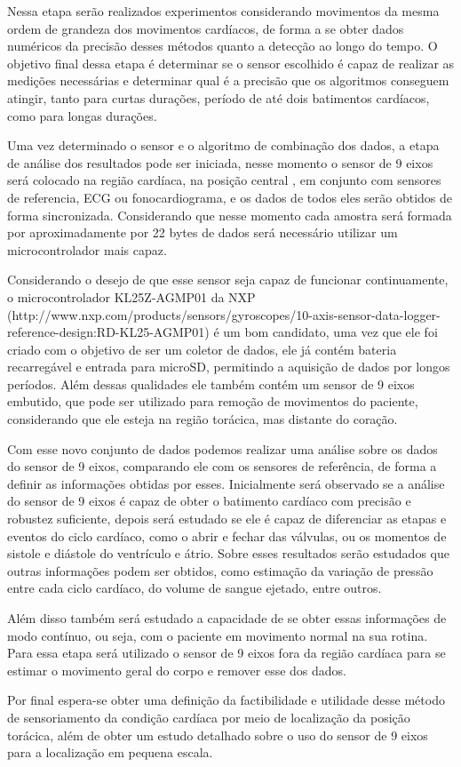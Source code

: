     Nessa etapa serão realizados experimentos considerando movimentos da mesma ordem de grandeza dos movimentos cardíacos, de forma a se obter dados numéricos da precisão desses métodos quanto a detecção ao longo do tempo. O objetivo final dessa etapa é determinar se o sensor escolhido é capaz de realizar as medições necessárias e determinar qual é a precisão que os algoritmos conseguem atingir, tanto para curtas durações, período de até dois batimentos cardíacos, como para longas durações.  

    Uma vez determinado o sensor e o algoritmo de combinação dos dados, a etapa de análise dos resultados pode ser iniciada, nesse momento o sensor de 9 eixos será colocado na região cardíaca, na posição central%
, em conjunto com sensores de referencia, ECG ou fonocardiograma, e os dados de todos eles serão obtidos de forma sincronizada. Considerando que nesse momento cada amostra será formada por aproximadamente por 22 bytes de dados será necessário utilizar um microcontrolador mais capaz.

    Considerando o desejo de que esse sensor seja capaz de funcionar continuamente, o microcontrolador KL25Z-AGMP01 da NXP (http://www.nxp.com/products/sensors/gyroscopes/10-axis-sensor-data-logger-reference-design:RD-KL25-AGMP01) é um bom candidato, uma vez que ele foi criado com o objetivo de ser um coletor de dados, ele já contém bateria recarregável e entrada para microSD, permitindo a aquisição de dados por longos períodos. Além dessas qualidades ele também contém um sensor de 9 eixos embutido, que pode ser utilizado para remoção de movimentos do paciente, considerando que ele esteja na região torácica, mas distante do coração.

    Com esse novo conjunto de dados podemos realizar uma análise sobre os dados do sensor de 9 eixos, comparando ele com os sensores de referência, de forma a definir as informações obtidas por esses. Inicialmente será observado se a análise do sensor de 9 eixos é capaz de obter o batimento cardíaco com precisão e robustez suficiente, depois será estudado se ele é capaz de diferenciar as etapas e eventos do ciclo cardíaco, como o abrir e fechar das válvulas, ou os momentos de sistole e diástole do ventrículo e átrio. Sobre esses resultados serão estudados que outras informações podem ser obtidos, como estimação da variação de pressão entre cada ciclo cardíaco, do volume de sangue ejetado, entre outros.

    Além disso também será estudado a capacidade de se obter essas informações de modo contínuo, ou seja, com o paciente em movimento normal na sua rotina. Para essa etapa será utilizado o sensor de 9 eixos fora da região cardíaca para se estimar o movimento geral do corpo e remover esse dos dados.

    Por final espera-se obter uma definição da factibilidade e utilidade desse método de sensoriamento da condição cardíaca por meio de localização da posição torácica, além de obter um estudo detalhado sobre o uso do sensor de 9 eixos para a localização em pequena escala. 
